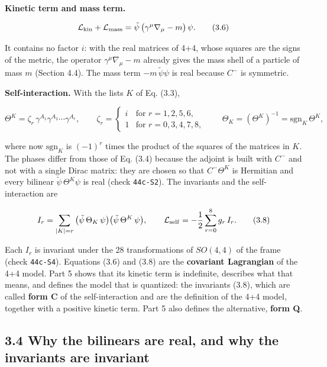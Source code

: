 \documentclass[
  10pt,
]{article}
\begin{document}
\textbf{Kinetic term and mass term.}

\[\mathcal L_{\rm kin}+\mathcal L_{\rm mass}=\tilde\psi\,\big(\gamma^\mu\nabla_\mu-m\big)\,\psi.\tag{3.6}\]

It contains no factor \(i\): with the real matrices of 4+4, whose
squares are the signs of the metric, the operator
\(\gamma^\mu\nabla_\mu-m\) already gives the mass shell of a particle of
mass \(m\) (Section 4.4). The mass term \(-m\,\tilde\psi\psi\) is real
because \(C^-\) is symmetric.

\textbf{Self-interaction.} With the lists \(K\) of Eq. (3.3),

\[\Theta^K=\zeta_r\,\gamma^{A_1}\gamma^{A_2}\cdots\gamma^{A_r},\qquad
\zeta_r=\begin{cases}i&\text{for }r=1,2,5,6,\\1&\text{for }r=0,3,4,7,8,\end{cases}
\qquad\Theta_K=(\Theta^K)^{-1}=\mathrm{sgn}_K\,\Theta^K,\tag{3.7}\]

where now \(\mathrm{sgn}_K\) is \((-1)^r\) times the product of the
squares of the matrices in \(K\). The phases differ from those of Eq.
(3.4) because the adjoint is built with \(C^-\) and not with a single
Dirac matrix: they are chosen so that \(C^-\Theta^K\) is Hermitian and
every bilinear \(\tilde\psi\,\Theta^K\psi\) is real (check
\texttt{44c-S2}). The invariants and the self-interaction are

\[I_r=\sum_{|K|=r}\big(\tilde\psi\,\Theta_K\,\psi\big)\big(\tilde\psi\,\Theta^K\,\psi\big),\qquad
\mathcal L_{\rm self}=-\frac12\sum_{r=0}^{8}g_r\,I_r.\tag{3.8}\]

Each \(I_r\) is invariant under the 28 transformations of \(SO(4,4)\) of
the frame (check \texttt{44c-S4}). Equations (3.6) and (3.8) are the
\textbf{covariant Lagrangian} of the 4+4 model. Part 5 shows that its
kinetic term is indefinite, describes what that means, and defines the
model that is quantized: the invariants (3.8), which are called
\textbf{form C} of the self-interaction and are the definition of the
4+4 model, together with a positive kinetic term. Part 5 also defines
the alternative, \textbf{form Q}.

\hypertarget{why-the-bilinears-are-real-and-why-the-invariants-are-invariant}{%
\subsection{3.4 Why the bilinears are real, and why the invariants are
invariant}\label{why-the-bilinears-are-real-and-why-the-invariants-are-invariant}}
\end{document}
